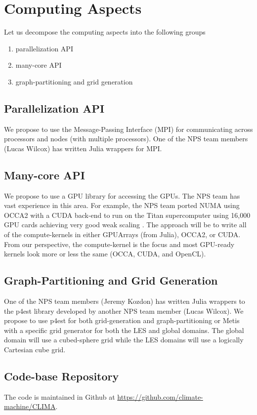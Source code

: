 \documentclass{article}
\begin{document}
\section{Computing Aspects}
\label{sec:computing_aspects}

Let us decompose the computing aspects into the following groups
\begin{enumerate}
\item parallelization API
\item many-core API
\item graph-partitioning and grid generation

\end{enumerate}

\subsection{Parallelization API}
We propose to use the Message-Passing Interface (MPI) for communicating across processors and nodes (with multiple processors).  One of the NPS team members (Lucas Wilcox) has written Julia wrappers for MPI.

\subsection{Many-core API}
\label{sec:computing_aspects/manycore}
We propose to use a GPU library for accessing the GPUs. The NPS team has vast experience in this area. For example, the NPS team ported NUMA using OCCA2 with a CUDA back-end to run on the Titan supercomputer using 16,000 GPU cards achieving very good weak scaling \citep{abdi:2016b,abdi:2018}. The approach will be to write all of the compute-kernels in either GPUArrays (from Julia), OCCA2, or CUDA. From our perspective, the compute-kernel is the focus and most GPU-ready kernels look more or less the same (OCCA, CUDA, and OpenCL). 

\subsection{Graph-Partitioning and Grid Generation}
One of the NPS team members (Jeremy Kozdon) has written Julia wrappers to the p4est library developed by another NPS team member (Lucas Wilcox).  We propose to use p4est for both grid-generation and graph-partitioning or Metis with a specific grid generator for both the LES and global domains. The global domain will use a cubed-sphere grid while the LES domains will use a logically Cartesian cube grid.

\subsection{Code-base Repository}
The code is maintained in Github at \url{https://github.com/climate-machine/CLIMA}.



\end{document}
